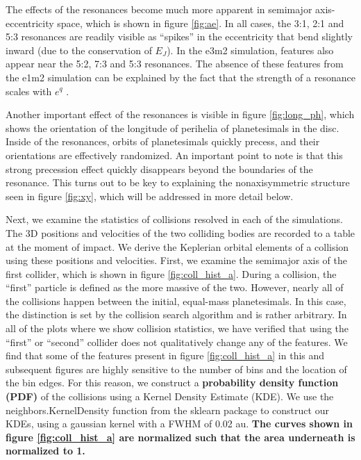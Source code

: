 \documentclass[fleqn,usenatbib]{mnras}
\begin{document}
The effects of the resonances become much more apparent in semimajor axis-eccentricity space, which is shown in figure \ref{fig:ae}. In all cases, 
the 3:1, 2:1 and 5:3 resonances are readily visible as ``spikes'' in the eccentricity that bend slightly inward (due to the conservation of $E_{J}$). In the 
e3m2 simulation, features also appear near the 5:2, 7:3 and 5:3 resonances. The absence of these features from the e1m2 simulation can be 
explained by the fact that the strength of a resonance scales with $e^{q}$ \citep{1994PhyD...77..289M}.

Another important effect of the resonances is visible in figure \ref{fig:long_ph}, which shows the orientation of the longitude of perihelia of 
planetesimals in the disc. Inside of the resonances, orbits of planetesimals quickly precess, and their orientations are effectively randomized. An 
important point to note is that this strong precession effect quickly disappears beyond the boundaries of the resonance. This turns out to be 
key to explaining the nonaxisymmetric structure seen in figure \ref{fig:xy}, which will be addressed in more detail below.

Next, we examine the statistics of collisions resolved in each of the simulations. The 3D positions and velocities of the two colliding bodies are 
recorded to a table at the moment of impact. We derive the Keplerian orbital elements of a collision using these positions and velocities. 
First, we examine the semimajor axis of the first collider, which is shown in figure \ref{fig:coll_hist_a}. During a collision, the ``first'' particle is defined 
as the more massive of the two. However, nearly all of the collisions happen between the initial, equal-mass planetesimals. In this case, the 
distinction is set by the collision search algorithm and is rather arbitrary. In all of the plots where we show collision statistics, we have verified that 
using the ``first'' or ``second'' collider does not qualitatively change any of the features. We find that some of the features present in figure 
\ref{fig:coll_hist_a} in this and subsequent figures are highly sensitive to the number of bins and the location of the bin edges. For this reason, we 
construct a \textbf{probability density function (PDF)} of the collisions using a Kernel Density Estimate (KDE). We use the {\sc neighbors.KernelDensity} function from the {\sc sklearn} 
\citep{scikit-learn} package to construct our KDEs, using a gaussian kernel with a FWHM of 0.02 au. \textbf{The curves shown in figure \ref{fig:coll_hist_a} are normalized such that the area underneath is normalized to 1.}
\end{document}
